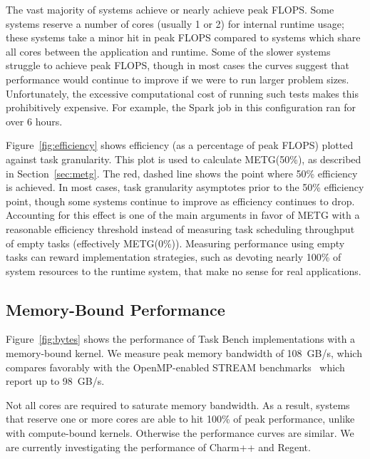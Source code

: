 The vast majority of systems achieve or nearly achieve peak FLOPS. Some
systems reserve a number of cores (usually 1 or 2) for internal
runtime usage; these systems take a minor hit in peak FLOPS compared
to systems which share all cores between the application and runtime. Some of the
slower systems struggle to achieve peak FLOPS, though in most cases
the curves suggest that performance would continue to improve if we
were to run larger problem sizes. Unfortunately, the excessive
computational cost of running such tests makes this prohibitively
expensive. For example, the Spark job in
this configuration ran for over 6 hours.

Figure~\ref{fig:efficiency} shows efficiency (as a percentage of
peak FLOPS) plotted against task granularity. This plot is
used to calculate METG(50\%), as described in Section~\ref{sec:metg}. The
red, dashed line shows the point where 50\% efficiency is achieved.
In most cases, task granularity asymptotes prior to the 50\% efficiency point,
though some systems continue to improve as efficiency continues
to drop. Accounting for this effect is one of the main arguments in
favor of METG with a reasonable efficiency threshold instead of
measuring task scheduling throughput of empty tasks
(effectively METG(0\%)). Measuring performance using empty tasks can
reward implementation strategies, such as devoting nearly 100\% of
system resources to the runtime system, that make no sense for real
applications.

\subsection{Memory-Bound Performance}



Figure~\ref{fig:bytes} shows the performance of Task Bench
implementations with a memory-bound kernel. We measure peak memory
bandwidth of 108~GB/s, which compares favorably with the
OpenMP-enabled STREAM benchmarks~\cite{STREAM} which report up to 98~GB/s.

Not all cores are required to saturate memory bandwidth. As a result,
systems that reserve one or more cores are able to hit 100\% of peak
performance, unlike with compute-bound kernels. Otherwise the
performance curves are similar. We are currently investigating the
performance of Charm++ and Regent.


